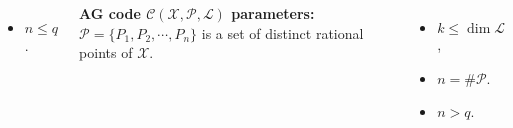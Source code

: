 \documentclass[
10pt, %
%
aspectratio=169, %
]{beamer}
\theoremstyle{plain}%
\theoremstyle{definition}
\theoremstyle{remark}
\newcommand{\calP}{\mathcal{P}}
\newcommand{\calL}{\mathcal{L}}
\newcommand{\calX}{\mathcal{X}}
\begin{document}
\begin{frame}
\begin{columns}
\begin{itemize}
			\item $n\leq q$.
		\end{itemize}
	\textbf{\textcolor{amaranth}{AG code $\mathcal{C}(\mathcal{X}, \mathcal{P},\calL)$ parameters:}}\\
	$\calP=\{P_1,P_2,\cdots,P_n\}$ is a set of distinct rational points of $\calX$.\\
		\begin{itemize}
			\item $k \leq \dim \calL$,
			\item $n=\# \calP$.
			\item[\color{amaranth}{\ding{52}}] $n>q$.
		\end{itemize}
		\vspace{0.5em}
		\end{columns}
	\end{frame}
	
\end{document}
